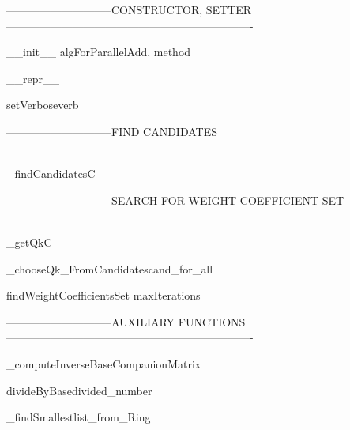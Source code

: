-----------------------------CONSTRUCTOR, SETTER-------------------------------------------------------------------

\begin{method}{\_\_init\_\_}{ algForParallelAdd, method}

\end{method}


\begin{method}{\_\_repr\_\_}{}

\end{method}


\begin{method}{setVerbose}{verb}

\end{method}


-----------------------------FIND CANDIDATES-------------------------------------------------------------------

\begin{method}{\_findCandidates}{C}

\end{method}


-----------------------------SEARCH FOR WEIGHT COEFFICIENT SET--------------------------------------------------

\begin{method}{\_getQk}{C}

\end{method}


\begin{method}{\_chooseQk\_FromCandidates}{cand\_for\_all}

\end{method}


\begin{method}{findWeightCoefficientsSet}{ maxIterations}

\end{method}


-----------------------------AUXILIARY FUNCTIONS-------------------------------------------------------------------

\begin{method}{\_computeInverseBaseCompanionMatrix}{}

\end{method}


\begin{method}{divideByBase}{divided\_number}

\end{method}


\begin{method}{\_findSmallest}{list\_from\_Ring}

\end{method}
